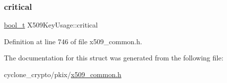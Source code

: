 \mbox{\label{structX509KeyUsage_a111fd22c20e3dd57cbc8036432987a57}} 
\subsubsection{\texorpdfstring{critical}{critical}}
{\footnotesize\ttfamily \hyperlink{compiler__port_8h_a812d16e5494522586b3784e55d479912}{bool\+\_\+t} X509\+Key\+Usage\+::critical}



Definition at line 746 of file x509\+\_\+common.\+h.



The documentation for this struct was generated from the following file\+:\begin{DoxyCompactItemize}
\item 
cyclone\+\_\+crypto/pkix/\hyperlink{pkix_2x509__common_8h}{x509\+\_\+common.\+h}\end{DoxyCompactItemize}
